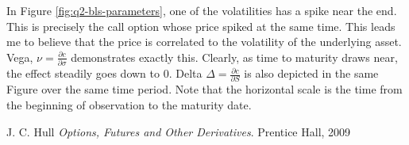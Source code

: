 \documentclass[11pt, fleqn]{article}
\begin{document}
In Figure \ref{fig:q2-bls-parameters}, one of the volatilities has a spike near the end. This is precisely the call option whose price spiked at the same time. This leads me to believe that the price is correlated to the volatility of the underlying asset. Vega, $\nu=\frac{\partial c}{\partial \sigma}$ demonstrates exactly this. Clearly, as time to maturity draws near, the effect steadily goes down to 0. Delta $\Delta=\frac{\partial c}{\partial S}$ is also depicted in the same Figure over the same time period. Note that the horizontal scale is the time from the beginning of observation to the maturity date.




























\begin{thebibliography}{9}
J. C. Hull
\textit{Options, Futures and Other Derivatives}. 
Prentice Hall, 2009

\end{thebibliography}
\end{document}
